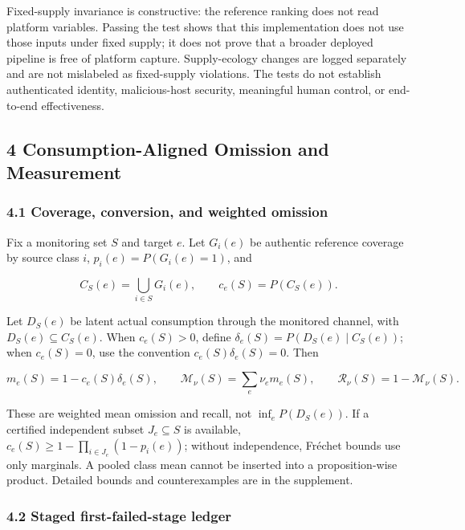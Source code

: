 \documentclass[
  11pt]{article}
\begin{document}
Fixed-supply invariance is constructive: the reference ranking does not
read platform variables. Passing the test shows that this implementation
does not use those inputs under fixed supply; it does not prove that a
broader deployed pipeline is free of platform capture. Supply-ecology
changes are logged separately and are not mislabeled as fixed-supply
violations. The tests do not establish authenticated identity,
malicious-host security, meaningful human control, or end-to-end
effectiveness.

\subsection{4 Consumption-Aligned Omission and
Measurement}\label{consumption-aligned-omission-and-measurement}

\subsubsection{4.1 Coverage, conversion, and weighted
omission}\label{coverage-conversion-and-weighted-omission}

Fix a monitoring set \(S\) and target \(e\). Let \(G_i(e)\) be authentic
reference coverage by source class \(i\), \(p_i(e)=P(G_i(e)=1)\), and

\[C_S(e)=\bigcup_{i\in S}G_i(e),\qquad c_e(S)=P(C_S(e)).\]

Let \(D_S(e)\) be latent actual consumption through the monitored
channel, with \(D_S(e)\subseteq C_S(e)\). When \(c_e(S)>0\), define
\(\delta_e(S)=P(D_S(e)\mid C_S(e))\); when \(c_e(S)=0\), use the
convention \(c_e(S)\delta_e(S)=0\). Then

\[m_e(S)=1-c_e(S)\delta_e(S),\qquad \mathcal M_\nu(S)=\sum_e\nu_e m_e(S),\qquad \mathcal R_\nu(S)=1-\mathcal M_\nu(S).\tag{4}\]

These are weighted mean omission and recall, not \(\inf_e P(D_S(e))\).
If a certified independent subset \(J_e\subseteq S\) is available,
\(c_e(S)\ge1-\prod_{i\in J_e}(1-p_i(e))\); without independence, Fréchet
bounds use only marginals. A pooled class mean cannot be inserted into a
proposition-wise product. Detailed bounds and counterexamples are in the
supplement.

\subsubsection{4.2 Staged first-failed-stage
ledger}\label{staged-first-failed-stage-ledger}
\end{document}
